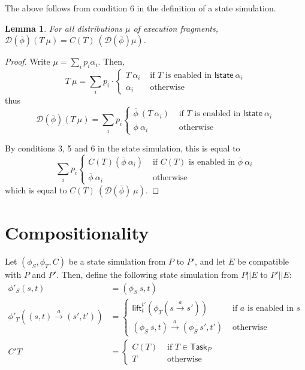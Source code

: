 \documentclass{article}
\newcommand{\Task}{\mathsf{Task}}
\newcommand{\lst}{\mathsf{lstate}}
\newcommand{\D}{\mathcal{D}}
\newtheorem{lemma}{Lemma}
\begin{document}
The above follows from condition 6 in the definition of a state simulation.

\begin{lemma}
    For all distributions $\mu$ of execution fragments, $\D(\overline{\phi})(T\ \mu) = C(T)\ (\D(\overline{\phi}) \mu)$.
\end{lemma}
\begin{proof}
    Write $\mu = \sum_i p_i \alpha_i$. Then, 
    \[T\ \mu = \sum_i p_i \cdot \begin{cases} T\ \alpha_i & \text{ if $T$ is enabled in $\lst\ \alpha_i$} \\
                                        \alpha_i & \text{ otherwise } \end{cases} \] 
    thus
    \[\D(\overline{\phi})(T\ \mu) = \sum_i p_i \begin{cases} \overline{\phi}\ (T\ \alpha_i) & \text{ if $T$ is enabled in $\lst\ \alpha_i$} \\
            \overline{\phi}\ \alpha_i & \text{ otherwise } \end{cases} \] 

    By conditions 3, 5 and 6 in the state simulation, this is equal to
    \[\sum_i p_i \begin{cases} C(T) (\overline{\phi}\ \alpha_i)  & \text{ if $C(T)$ is enabled in $\overline{\phi}\ \alpha_i$} \\
            \overline{\phi}\ \alpha_i & \text{ otherwise } \end{cases} \] 
    which is equal to $C(T)\ (\D(\overline{\phi})\ \mu)$.

\end{proof}

\section{Compositionality}
Let $(\phi_S, \phi_T, C)$ be a state simulation from $P$ to $P'$, and let $E$ be compatible with $P$ and $P'$. Then, define the following state simulation from $P || E$ to $P' || E$:
\begin{align*}
    \phi'_S (s,t) &= (\phi_S\ s, t) \\
    \phi'_T ((s,t) \xrightarrow{a} (s', t')) &=
        \begin{cases}
            \mathsf{lift}_t^{t'} (\phi_T (s \xrightarrow{a} s')) & \text{ if $a$ is enabled in $s$ } \\
            (\phi_S\ s,t) \xrightarrow{a} (\phi_S\ s', t') & \text{ otherwise } 
        \end{cases} \\
    C' T &= \begin{cases}
        C(T) & \text{ if $T \in \Task_P$ } \\
        T & \text{ otherwise }
    \end{cases}
\end{align*}
\end{document}
